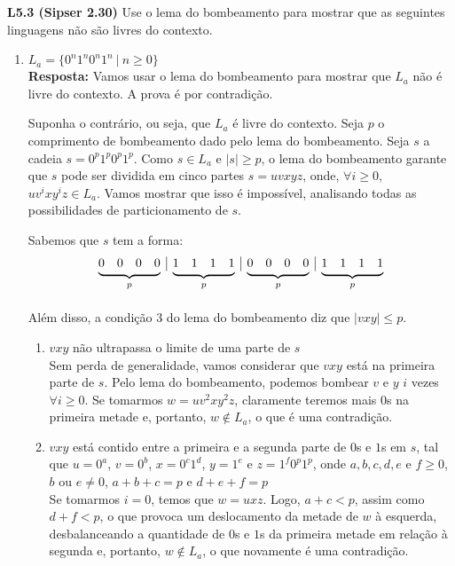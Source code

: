 
\noindent \textbf{L5.3 (Sipser 2.30)} Use o lema do bombeamento para mostrar que as seguintes linguagens não são livres do contexto.
\begin{enumerate}[label={\textbf{\alph*.}}]
    
    \item $L_a = \{0^n1^n0^n1^n \ |\ n \geq 0\}$\\[3pt]
    \textbf{Resposta:} Vamos usar o lema do bombeamento para mostrar que $L_a$ não é livre do contexto. A prova é por contradição.
    
    Suponha o contrário, ou seja, que $L_a$ é livre do contexto. Seja $p$ o comprimento de bombeamento dado pelo lema do bombeamento. Seja $s$ a cadeia $s = 0^p1^p0^p1^p$. Como $s \in L_a$ e $|s| \geq p$, o lema do bombeamento garante que $s$ pode ser dividida em cinco partes $s = uvxyz$, onde, $\forall i \geq 0$, $uv^ixy^iz \in L_a$. Vamos mostrar que isso é impossível, analisando todas as possibilidades de particionamento de $s$.
    
    Sabemos que $s$ tem a forma:
    \[
    \begin{array}{rrrr|rrrr|rrrr|rrrr}
        \undermat{p}{0&0&0&0} & \undermat{p}{1&1&1&1} & \undermat{p}{0&0&0&0} & \undermat{p}{1&1&1&1} \\
    \end{array}
    \]
    \
    
    Além disso, a condição 3 do lema do bombeamento diz que $|vxy| \leq p$.
    
    \begin{enumerate}[label={\textbf{Caso \arabic*:}}]
        \item $vxy$ não ultrapassa o limite de uma parte de $s$\\[2pt]
        Sem perda de generalidade, vamos considerar que $vxy$ está na primeira parte de $s$. Pelo lema do bombeamento, podemos bombear $v$ e $y$ $i$ vezes $\forall i \geq 0$. Se tomarmos $w = uv^2xy^2z$, claramente teremos mais $0$s na primeira metade e, portanto, $w \notin L_a$, o que é uma contradição.
        
        \item $vxy$ está contido entre a primeira e a segunda parte de $0$s e $1$s em $s$, tal que $u = 0^a$, $v = 0^b$, $x = 0^c1^d$, $y = 1^e$ e $z = 1^f0^p1^p$, onde $a, b, c, d, e$ e $f \geq 0$, $b$ ou $e \neq 0$, $a + b + c = p$ e $d + e + f = p$\\[2pt]
        Se tomarmos $i = 0$, temos que $w = uxz$. Logo, $a + c < p$, assim como $d + f < p$, o que provoca um deslocamento da metade de $w$ à esquerda, desbalanceando a quantidade de $0$s e $1$s da primeira metade em relação à segunda e, portanto, $w \notin L_a$, o que novamente é uma contradição.
        

\end{enumerate}
\end{enumerate}
